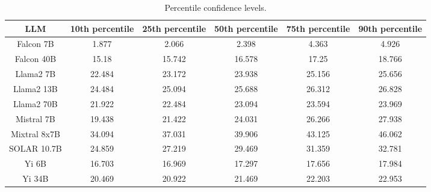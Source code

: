 \begin{table*}
\centering
\begin{tabular}{c|c|c|c|c|c}
LLM & 10th percentile & 25th percentile & 50th percentile & 75th percentile & 90th percentile\\ \hline
Falcon 7B & 1.877 & 2.066 & 2.398 & 4.363 & 4.926\\
Falcon 40B & 15.18 & 15.742 & 16.578 & 17.25 & 18.766\\
Llama2 7B & 22.484 & 23.172 & 23.938 & 25.156 & 25.656\\
Llama2 13B & 24.484 & 25.094 & 25.688 & 26.312 & 26.828\\
Llama2 70B & 21.922 & 22.484 & 23.094 & 23.594 & 23.969\\
Mistral 7B & 19.438 & 21.422 & 24.031 & 26.266 & 27.938\\
Mixtral 8x7B & 34.094 & 37.031 & 39.906 & 43.125 & 46.062\\
SOLAR 10.7B & 24.859 & 27.219 & 29.469 & 31.359 & 32.781\\
Yi 6B & 16.703 & 16.969 & 17.297 & 17.656 & 17.984\\
Yi 34B & 20.469 & 20.922 & 21.469 & 22.203 & 22.953\\
\hline
\end{tabular}
\caption{Percentile confidence levels.}
\label{tab:percentile_conf}
\end{table*}
